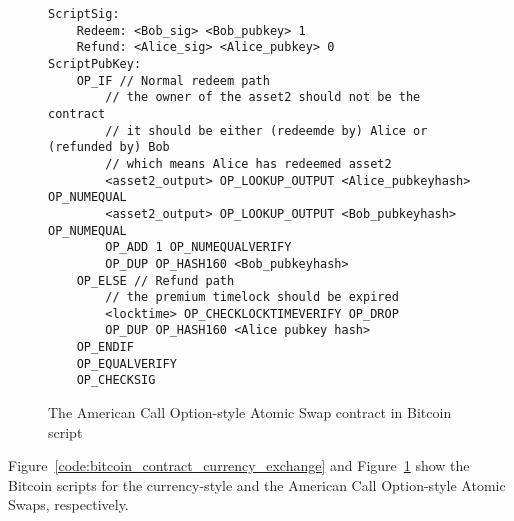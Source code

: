 \begin{figure}
\begin{lstlisting}[language=Solidity, basicstyle=\tiny]
ScriptSig:
    Redeem: <Bob_sig> <Bob_pubkey> 1
    Refund: <Alice_sig> <Alice_pubkey> 0
ScriptPubKey:
    OP_IF // Normal redeem path
        // the owner of the asset2 should not be the contract
        // it should be either (redeemde by) Alice or (refunded by) Bob
        // which means Alice has redeemed asset2
        <asset2_output> OP_LOOKUP_OUTPUT <Alice_pubkeyhash> OP_NUMEQUAL
        <asset2_output> OP_LOOKUP_OUTPUT <Bob_pubkeyhash> OP_NUMEQUAL
        OP_ADD 1 OP_NUMEQUALVERIFY
        OP_DUP OP_HASH160 <Bob_pubkeyhash>
    OP_ELSE // Refund path
        // the premium timelock should be expired
        <locktime> OP_CHECKLOCKTIMEVERIFY OP_DROP
        OP_DUP OP_HASH160 <Alice pubkey hash>
    OP_ENDIF
    OP_EQUALVERIFY
    OP_CHECKSIG
\end{lstlisting}
\label{code:bitcoin_contract_option}
\caption{The American Call Option-style Atomic Swap contract in Bitcoin script}
\end{figure}

Figure~\ref{code:bitcoin_contract_currency_exchange} and Figure~\ref{code:bitcoin_contract_option} show the Bitcoin scripts for the currency-style and the American Call Option-style Atomic Swaps, respectively.


